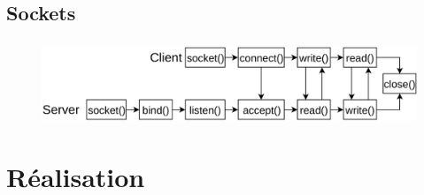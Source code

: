 \documentclass[10pt]{beamer}
\begin{document}
\subsection{Sockets}
\begin{frame}
    \frametitle{\subsecname}
    \begin{figure}
        \begin{center}
            \includegraphics[width=1\textwidth]{images/sockets2.png}
        \end{center}
    \end{figure}
\end{frame}

\section{Réalisation}
\end{document}
